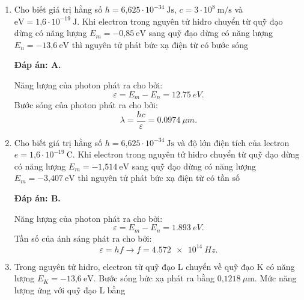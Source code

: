 \begin{enumerate}[label=\bfseries Câu \arabic*:]
{	}
	
	\item {} 
		\cauhoi
	{Cho biết giá trị hằng số $h=\text{6,625}\cdot 10^{-34}\ \text{Js}$, $c=3\cdot 10^8\ \text{m/s}$ và $\text{eV}=\text{1,6}\cdot 10^{-19}\ \text{J}$. Khi electron trong nguyên tử hidro chuyển từ quỹ đạo dừng có năng lượng $E_m=-\text{0,85}\ \text{eV}$ sang quỹ đạo dừng có năng lượng $E_n=-\text{13,6}\ \text{eV}$ thì nguyên tử phát bức xạ điện từ có bước sóng 
	}
	
	\loigiai
	{		\textbf{Đáp án: A.}
		
Năng lượng của photon phát ra cho bởi:
$$
	\varepsilon = E_{m} - E_{n} = \SI{12,75}{eV}.
$$
Bước sóng của photon phát ra cho bởi:
$$
	\lambda = \dfrac{hc}{\varepsilon} = \SI{0,0974}{\mu m}.
$$
		
	}
	
	\item {} 
		\cauhoi
	{Cho biết giá trị hằng số $h=\text{6,625}\cdot 10^{-34}\ \text{Js}$ và độ lớn điện tích của lectron $e=\text{1,6}\cdot 10^{-19}\ \text{C}$. Khi electron trong nguyên tử hidro chuyển từ quỹ đạo dừng có năng lượng  $E_m=-\text{1,514}\ \text{eV}$ sang quỹ đạo dừng có năng lượng  $E_m=-\text{3,407}\ \text{eV}$ thì nguyên tử phát bức xạ điện từ có tần số
	}
	
	\loigiai
	{		\textbf{Đáp án: B.}
		
Năng lượng của photon phát ra cho bởi:
$$
	\varepsilon = E_{m} - E_{n} = \SI{1,893}{eV}.
$$
Tần số của ánh sáng phát ra cho bởi:
$$
	\varepsilon = hf \rightarrow f = \SI{4,572 e14}{Hz}.
$$
		
	}
	
\item {} 
		\cauhoi
	{Trong nguyên tử hidro, electron từ quỹ đạo L chuyển về quỹ đạo K có năng lượng $E_K= -\text{13,6}\ \text{eV}$. Bước sóng bức xạ phát ra bằng $\text{0,1218}\ \mu\text{m}$. Mức năng lượng ứng với quỹ đạo L bằng 
	}
	

\end{enumerate}
